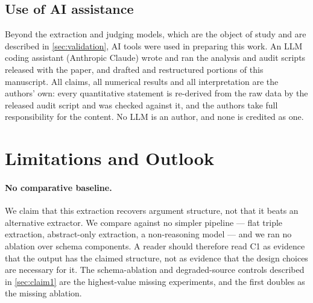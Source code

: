 \documentclass[10pt,twocolumn,letterpaper]{article}
\begin{document}
\subsection{Use of AI assistance}
\label{sec:aidisclosure}

Beyond the extraction and judging models, which are the object of study and are
described in \cref{sec:validation}, AI tools were used in preparing this work. An
LLM coding assistant (Anthropic Claude) wrote and ran the analysis and audit
scripts released with the paper, and drafted and restructured portions of this
manuscript. All claims, all numerical results and all interpretation are the
authors' own: every quantitative statement is re-derived from the raw data by the
released audit script and was checked against it, and the authors take full
responsibility for the content. No LLM is an author, and none is credited as one.

\section{Limitations and Outlook}
\label{sec:limitations}

\paragraph{No comparative baseline.} We claim that this extraction recovers
argument structure, not that it beats an alternative extractor. We compare
against no simpler pipeline --- flat triple extraction, abstract-only extraction,
a non-reasoning model --- and we ran no ablation over schema components.
A reader should therefore read C1 as evidence that the output has the claimed
structure, not as evidence that the design choices are necessary for it. The
schema-ablation and degraded-source controls described in \cref{sec:claim1} are
the highest-value missing experiments, and the first doubles as the missing
ablation.
\end{document}
